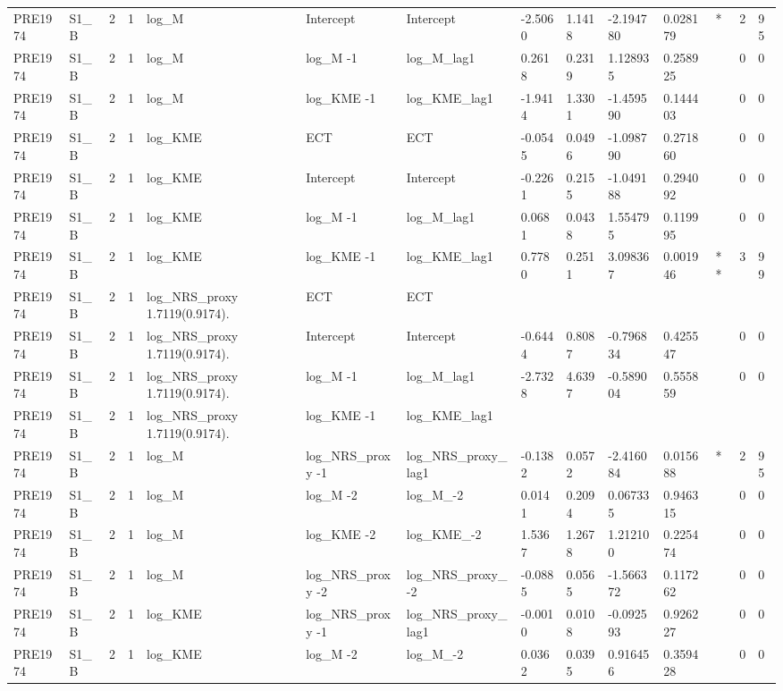 \begin{tabular}{llllllllllllll}
PRE1974 & S1\_B & 2 & 1 & log\_M & Intercept & Intercept & -2.5060 & 1.1418 & -2.194780 & 0.028179 & * & 2 & 95 \\
PRE1974 & S1\_B & 2 & 1 & log\_M & log\_M -1 & log\_M\_lag1 & 0.2618 & 0.2319 & 1.128935 & 0.258925 &  & 0 & 0 \\
PRE1974 & S1\_B & 2 & 1 & log\_M & log\_KME -1 & log\_KME\_lag1 & -1.9414 & 1.3301 & -1.459590 & 0.144403 &  & 0 & 0 \\
PRE1974 & S1\_B & 2 & 1 & log\_KME & ECT & ECT & -0.0545 & 0.0496 & -1.098790 & 0.271860 &  & 0 & 0 \\
PRE1974 & S1\_B & 2 & 1 & log\_KME & Intercept & Intercept & -0.2261 & 0.2155 & -1.049188 & 0.294092 &  & 0 & 0 \\
PRE1974 & S1\_B & 2 & 1 & log\_KME & log\_M -1 & log\_M\_lag1 & 0.0681 & 0.0438 & 1.554795 & 0.119995 &  & 0 & 0 \\
PRE1974 & S1\_B & 2 & 1 & log\_KME & log\_KME -1 & log\_KME\_lag1 & 0.7780 & 0.2511 & 3.098367 & 0.001946 & ** & 3 & 99 \\
PRE1974 & S1\_B & 2 & 1 & log\_NRS\_proxy 1.7119(0.9174). & ECT & ECT &  &  &  &  &  &  &  \\
PRE1974 & S1\_B & 2 & 1 & log\_NRS\_proxy 1.7119(0.9174). & Intercept & Intercept & -0.6444 & 0.8087 & -0.796834 & 0.425547 &  & 0 & 0 \\
PRE1974 & S1\_B & 2 & 1 & log\_NRS\_proxy 1.7119(0.9174). & log\_M -1 & log\_M\_lag1 & -2.7328 & 4.6397 & -0.589004 & 0.555859 &  & 0 & 0 \\
PRE1974 & S1\_B & 2 & 1 & log\_NRS\_proxy 1.7119(0.9174). & log\_KME -1 & log\_KME\_lag1 &  &  &  &  &  &  &  \\
PRE1974 & S1\_B & 2 & 1 & log\_M & log\_NRS\_proxy -1 & log\_NRS\_proxy\_lag1 & -0.1382 & 0.0572 & -2.416084 & 0.015688 & * & 2 & 95 \\
PRE1974 & S1\_B & 2 & 1 & log\_M & log\_M -2 & log\_M\_-2 & 0.0141 & 0.2094 & 0.067335 & 0.946315 &  & 0 & 0 \\
PRE1974 & S1\_B & 2 & 1 & log\_M & log\_KME -2 & log\_KME\_-2 & 1.5367 & 1.2678 & 1.212100 & 0.225474 &  & 0 & 0 \\
PRE1974 & S1\_B & 2 & 1 & log\_M & log\_NRS\_proxy -2 & log\_NRS\_proxy\_-2 & -0.0885 & 0.0565 & -1.566372 & 0.117262 &  & 0 & 0 \\
PRE1974 & S1\_B & 2 & 1 & log\_KME & log\_NRS\_proxy -1 & log\_NRS\_proxy\_lag1 & -0.0010 & 0.0108 & -0.092593 & 0.926227 &  & 0 & 0 \\
PRE1974 & S1\_B & 2 & 1 & log\_KME & log\_M -2 & log\_M\_-2 & 0.0362 & 0.0395 & 0.916456 & 0.359428 &  & 0 & 0 \\

\end{tabular}
